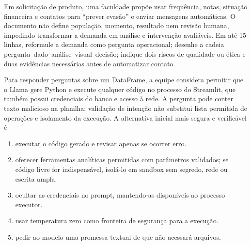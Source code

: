 \documentclass[12pt,a4paper]{article}
\begin{document}
\TextoBase Em solicitação de produto, uma faculdade propõe usar frequência, notas, situação financeira e contatos para ``prever evasão'' e enviar mensagens automáticas. O documento não define população, momento, resultado nem revisão humana, impedindo transformar a demanda em análise e intervenção avaliáveis.
\FonteDidatica
\Comando Em até 15 linhas, reformule a demanda como pergunta operacional; desenhe a cadeia pergunta--dado--análise--visual--decisão; indique dois riscos de qualidade ou ética e duas evidências necessárias antes de automatizar contato.
\EspacoDiscursiva

\TextoBase
Para responder perguntas sobre um DataFrame, a equipe considera permitir que o Llama gere Python e execute qualquer código no processo do Streamlit, que também possui credenciais do banco e acesso à rede.
A pergunta pode conter texto malicioso na planilha; validação de intenção não substitui lista permitida de operações e isolamento da execução.
\FonteDidatica
\Comando A alternativa inicial mais segura e verificável é
\begin{enumerate}[label=\Alph*)]
  \item executar o código gerado e revisar apenas se ocorrer erro.
  \item oferecer ferramentas analíticas permitidas com parâmetros validados; se código livre for indispensável, isolá-lo em sandbox sem segredo, rede ou escrita ampla.
  \item ocultar as credenciais no prompt, mantendo-as disponíveis ao processo executor.
  \item usar temperatura zero como fronteira de segurança para a execução.
  \item pedir ao modelo uma promessa textual de que não acessará arquivos.
\end{enumerate}
\end{document}
